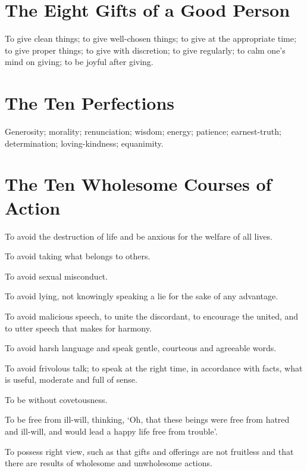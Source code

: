 \section*{The Eight Gifts of a Good Person}

To give clean things; to give well-chosen things; to give at the appropriate
time; to give proper things; to give with discretion; to give regularly; to calm
one's mind on giving; to be joyful after giving.\\
\mbox{}

\vspace*{-\baselineskip}

\section*{The Ten Perfections}

Generosity; morality; renunciation; wisdom; energy; patience; earnest-truth;
determination; loving-kindness; equanimity.\\
\mbox{}

\vspace*{-\baselineskip}

\section*{The Ten Wholesome Courses of Action}

To avoid the destruction of life and be anxious for the welfare of all lives.

To avoid taking what belongs to others.

To avoid sexual misconduct.

To avoid lying, not knowingly speaking a lie for the sake of any advantage.

To avoid malicious speech, to unite the discordant, to encourage the united, and
to utter speech that makes for harmony.

To avoid harsh language and speak gentle, courteous and agreeable words.

To avoid frivolous talk; to speak at the right time, in accordance with facts,
what is useful, moderate and full of sense.

To be without covetousness.

To be free from ill-will, thinking, ‘Oh, that these beings were free from hatred
and ill-will, and would lead a happy life free from trouble’.

To possess right view, such as that gifts and offerings are not fruitless and
that there are results of wholesome and unwholesome actions.

